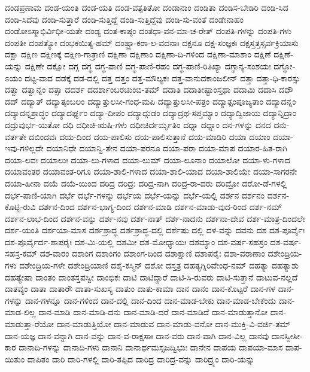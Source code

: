 {ದಂಡಪ್ರಣಾಮ
ದಂಡ-ಯಂತಿ
ದಂಡ-ಯತಿ
ದಂಡ-ವತ್ಪತಿತೋ
ದಂಡಾನಾಂ
ದಂಡಿತಾ
ದಂಡಿಸ-ಬೇಡಿರಿ
ದಂಡಿ-ಸಿದ
ದಂಡಿ-ಸಿದೆವು
ದಂಡಿ-ಸುತ್ತಾರೆ
ದಂಡಿ-ಸುತ್ತಿದ್ದೆ
ದಂಡಿ-ಸುತ್ತಿದ್ದೆವು
ದಂಡಿ-ಸು-ವಂತೆ
ದಂಡೇನಾಹಂ
ದಂಡೋಽಸ್ಮಾಭಿರ್ವಿಧೀ-ಯತೇ
ದಂಡ್ಯ
ದಂತ-ಕಾಷ್ಠಂ
ದಂತಧಾ-ವನ-ಮಾ-ಚ-ರೇತ್
ದಂಪತಿ-ಗಳನ್ನು
ದಂಪತಿ-ಗಳು
ದಂಪತೀ
ದಂಪತ್ಯೋ
ದಂಭಕಯಿತ್ಯ-ಹಮ್
ದಂಷ್ಟ್ರಾ-ಕರಾ-ಲ-ವದನಾಃ
ದಕ್ಷನೂ
ದಕ್ಷ-ಸಂಜ್ಞಕಃ
ದಕ್ಷಸ್ತತ್ತಸ್ಸರ್ವಕ್ರಿಯಾಸು
ದಕ್ಷಾ
ದಕ್ಷಿಣ
ದಕ್ಷಿಣಕ್ಕೆ
ದಕ್ಷಿಣ-ಗಾತ್ರಾಣಿ
ದಕ್ಷಿಣಾ
ದಕ್ಷಿಣಾಂ
ದಕ್ಷಿಣಾ-ದಿ-ಗಳಿಂದ
ದಕ್ಷಿಣಾ-ಮಾಶಾಂ
ದಕ್ಷಿಣೆ
ದಕ್ಷಿಣೆ-ಯನ್ನು
ದಕ್ಷಿಣೇ
ದಕ್ಷೋ
ದಗ್ಗ
ದಗ್ಧ
ದಗ್ಧ-ಪಾಣಿ
ದಗ್ಧ-ಪಾಣಿ-ರಹಂ
ದಗ್ಧ-ಪಾಣಿ-ರಿತಿಖ್ಯಾ
ದಗ್ಧಾನ್ಯ-ಸಂಶಯಃ
ದಗ್ಧೋ-ಽಯಂ
ದಟ್ಟ-ವಾದ
ದಡಕ್ಕೆ
ದಡ-ದಲ್ಲಿ
ದತ್ತ
ದತ್ತಂ
ದತ್ತ-ಮೌಲ್ಯಕಃ
ದತ್ತ-ವಾನುದಕಾಂಜಲೀನ್
ದತ್ತಾ
ದತ್ತಾ-ಧಿ-ಕಾರಸ್ಸು
ದತ್ವಾ
ದತ್ವಾನ್ನಂ
ದತ್ಸಾ
ದದರ್ಶ
ದದರ್ಶಾಂಬರಚುಂಬಿ-ತಮ್
ದದಾತಿ
ದದಾತೀಷ್ಟಾಂಸ್ತಥಾ
ದದಾಮಿ
ದದಾಸಿ
ದದೌ
ದದ್
ದದ್ಯಾತ್
ದದ್ಯಾತ್ಕಂಬಲಂ
ದದ್ಯಾತ್ತುಲಸೀ-ಗಂಧ-ಮಪಿ
ದದ್ಯಾತ್ತುಲಸೀ-ಪತ್ರಂ
ದದ್ಯಾತ್ಸಂಪೂಜ್ಯತಾಂ
ದದ್ಯಾದನ್ನಂ
ದದ್ಯಾದನ್ನಶ್ರಾದ್ಧಂ
ದದ್ಯಾದರ್ಘ್ಯಂ
ದದ್ಯಾ-ದೀಪಂ
ದದ್ಯಾದ್ಗುಡಂ
ದದ್ಯಾದ್ರಥ-ಸಪ್ತಮ್ಯಾಂ
ದದ್ಯಾದ್ವಿಜಾಯ
ದದ್ಯಾನ್ನಿದ್ರಾಂ
ದದ್ರುವುರ್ಭ-ಯತೋ
ದಧಿ
ದಧೀಚಿ-ಋಷಿ-ಗಳು
ದಧೀಚಿರ್ದರ್ಮೃತಿಂ
ದಧ್ನಾ
ದಧ್ನಾಂ
ದನ-ಗಳನ್ನು
ದನದ
ದನು-ವರ್ತತೇ
ದಬಿಂದವಃ
ದಯ-ದಿಂದ
ದಯ-ಪಾಲಿಸು
ದಯ-ಪಾಲಿಸುತ್ತಾನೆ
ದಯ-ಮಾಡಿರಿ
ದಯಾ
ದಯಾಂ
ದಯಾ-ಇವು-ಗಳಿಲ್ಲದೇ
ದಯಾನಿಧೇ
ದಯಾನ್ವಿ-ತೇನ
ದಯಾ-ಪರನೂ
ದಯಾ-ಪರಾ
ದಯಾ-ಮಾಪ
ದಯಾರ-ಹಿತ-ರಾಗಿ
ದಯಾ-ಲವಃ
ದಯಾಲುಃ
ದಯಾ-ಲು-ಗಳಾದ
ದಯಾ-ಲುಮ್
ದಯಾ-ಲೂನಾಂ
ದಯಾಲೋ
ದಯಾ-ಳು-ಗಳಾದ
ದಯಾವಂತರ
ದಯಾವಂತ-ರಿಗೂ
ದಯಾ-ಶಾಲಿ-ಗಳಾದ
ದಯಾ-ಶಾಲಿ-ಯಾದ
ದಯಾ-ಶಾಲಿಯೇ
ದಯಾ-ಸಾಗರನೇ
ದಯಾ-ಹೀನಾ
ದಯೆ
ದಯೆ-ಯಿಂದ
ದರಿದ್ರ
ದರಿದ್ರಃ
ದರಿದ್ರ-ನಾಗಿ
ದರಿದ್ರ-ರಾ-ದರು
ದರಿದ್ರೋ
ದರೋ-ಡೆ-ಗಳಲ್ಲಿ
ದರ್ಭ-ಪಾಣಿ-ಯಾಗಿ
ದರ್ಭೆ
ದರ್ಭೆ-ಗಳನ್ನು
ದರ್ಭೆಯ
ದರ್ಭೆ-ಯನ್ನು
ದರ್ಭೆ-ಯಲ್ಲಿ
ದರ್ಶನ
ದರ್ಶನಂ
ದರ್ಶನ-ಕೊಟ್ಟಿ-ರುವಿ
ದರ್ಶನ-ದಿಂದ
ದರ್ಶನ-ಭಾಗ್ಯ-ದಿಂದ
ದರ್ಶನ-ಮಾಡಿ
ದರ್ಶನ-ಮಾಡು-ವುದ-ರಿಂದ
ದರ್ಶ-ನಮ್
ದರ್ಶನ-ಲಾಭ-ದಿಂದ
ದರ್ಶನ-ವನ್ನು
ದರ್ಶ-ನವು
ದರ್ಶ-ನಾತ್
ದರ್ಶ-ನಾದನು
ದರ್ಶನಾ-ದೇವ
ದರ್ಶ-ಮಾತ್ರ-ದಿಂದಲೇ
ದರ್ಶ-ಯಂತಿ
ದರ್ಶಯಾ-ಮಾಸ
ದರ್ಶಶ್ರಾದ್ಧ
ದರ್ಶಶ್ರಾದ್ಧ-ದಲ್ಲಿ
ದರ್ಶೆಷು
ದಲ್ಲಿ
ದಳ-ವನ್ನು
ದವನು
ದಶ
ದಶ-ಪೂರ್ವೈಃ
ದಶ-ಪೂರ್ವೈರ್ದ-ಶಾಪರೈಃ
ದಶ-ಮಿ-ಯಲ್ಲಿ
ದಶಮೀ
ದಶ-ಮೋಧ್ಯಾಯಃ
ದಶಮ್ಯಾಂ
ದಶ-ವರ್ಷ-ಸಹಸ್ರಂ
ದಶ-ವರ್ಷ-ಸಹಸ್ರ-ಕಮ್
ದಶ-ವಾರಂ
ದಶಾಂಗ
ದಶಾಂಗಂ
ದಶಾಂಗ-ದಿಂದ
ದಶಾಕ್ಷಾಣಿ
ದಶಾಪರೈಃ
ದಶಾ-ವರಾಣಾಂ
ದಶೇಂದ್ರಿಯ-ಗಳು
ದಶೇಂದ್ರಿಯ-ಗಳೇ
ದಶೇಂದ್ರಿಯಾಣಿ
ದಶೈ-ಕಸ್ಮಿನ್
ದಶೋ
ದಸ್ತತ್ರ
ದಹತ್ಯಗ್ನಿರಿವೇಂಧ-ನಮ್
ದಹತ್ಯಾ
ದಹತ್ಯಾಶು
ದಹತ್ಯೇಷಾ
ದಾಂತಂ
ದಾಂತಸ್ತಪಸ್ವೀ
ದಾಂಭಿಕಃ
ದಾಟಿ
ದಾಟಿದ್ದಾರೆ
ದಾಟಿ-ಸಿ-ರುವರು
ದಾಟಿ-ಸುತ್ತಾನೆ
ದಾಟುವ-ನಲ್ಲದೆ
ದಾತವ್ಯಂ
ದಾತಾ
ದಾತಾರೌ
ದಾತಾ-ಸುಖಸ್ಯ
ದಾತುಂ
ದಾತು-ಕಾಮಾ
ದಾನ
ದಾನಂ
ದಾನ-ಕೊಟ್ಟರೆ
ದಾನ-ಗಳ
ದಾನ-ಗಳನ್ನು
ದಾನ-ಗಳನ್ನೂ
ದಾನ-ಗಳಿಂದ
ದಾನ-ದಲ್ಲಿ
ದಾನ-ದಿಂದ
ದಾನ-ಮಾಡ-ಬೇಕು
ದಾನ-ಮಾಡ-ಬೇಕೆಂದು
ದಾನ-ಮಾಡ-ಲಿಲ್ಲ
ದಾನ-ಮಾಡಿ
ದಾನ-ಮಾಡಿ-ದನು
ದಾನ-ಮಾಡಿ-ದರೆ
ದಾನ-ಮಾಡಿದೆ
ದಾನ-ಮಾಡುತ್ತಾನೋ
ದಾನ-ಮಾಡುತ್ತಾ-ರೆಯೋ
ದಾನ-ಮಾಡುತ್ತಿಯೋ
ದಾನ-ಮಾಡುವ
ದಾನ-ಮಾಡು-ವನೋ
ದಾನ-ಮುಕ್ತಿ-ವಿ-ವರ್ಜಿ-ತಮ್
ದಾನ-ಯಜ್ಞ
ದಾನ-ವನ್ನಾಗಿ
ದಾನ-ವನ್ನು
ದಾನ-ವ-ರಾಕ್ಷಸಾಃ
ದಾನ-ವರು
ದಾನ-ವಾಗಿ
ದಾನ-ವಿಲ್ಲ
ದಾನವು
ದಾನಸ್ವೀಸೀ-ಕಾರ
ದಾನಾದಿ-ಗಳನ್ನು
ದಾನಾದಿ-ಗಳು
ದಾನಾನಿ
ದಾನಾರ್ಥಮಸ್ಸಜದ್ವಿಭುಃ
ದಾನೇನ
ದಾಪಯ
ದಾಪಯಾ-ಮಾಸ
ದಾಪ-ಯಿತುಂ
ದಾಪಿತಂ
ದಾರಿ
ದಾರಿ-ಗಳಲ್ಲಿ
ದಾರಿ-ತಪ್ಪಿದ
ದಾರಿದ್ರ
ದಾರಿದ್ರ-ವನ್ನು
ದಾರಿದ್ರ್ಯಂ
ದಾರಿ-ಯನ್ನು
}
